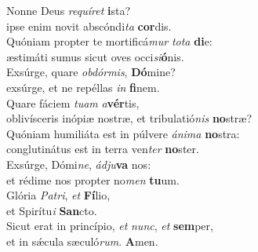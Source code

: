 \evenverse Nonne Deus \textit{re}\textit{quí}\textit{ret} \textbf{i}sta?~\*\\
\evenverse ipse enim novit abscóndi\textit{ta} \textbf{cor}dis.\\
\oddverse Quóniam propter te mortificá\textit{mur} \textit{to}\textit{ta} \textbf{di}e:~\*\\
\oddverse æstimáti sumus sicut oves occi\textit{si}\textbf{ó}nis.\\
\evenverse Exsúrge, quare \textit{ob}\textit{dór}\textit{mis}, \textbf{Dó}mine?~\*\\
\evenverse exsúrge, et ne repéllas \textit{in} \textbf{fi}nem.\\
\oddverse Quare fáciem \textit{tu}\textit{am} \textit{a}\textbf{vér}tis,~\*\\
\oddverse oblivísceris inópiæ nostræ, et tribulatió\textit{nis} \textbf{no}stræ?\\
\evenverse Quóniam humiliáta est in púlvere \textit{á}\textit{ni}\textit{ma} \textbf{no}stra:~\*\\
\evenverse conglutinátus est in terra ven\textit{ter} \textbf{no}ster.\\
\oddverse Exsúrge, Dómi\textit{ne}, \textit{ád}\textit{ju}\textbf{va} nos:~\*\\
\oddverse et rédime nos propter no\textit{men} \textbf{tu}um.\\
\evenverse Glória \textit{Pa}\textit{tri}, \textit{et} \textbf{Fí}lio,~\*\\
\evenverse et Spirítu\textit{i} \textbf{San}cto.\\
\oddverse Sicut erat in princípio, \textit{et} \textit{nunc}, \textit{et} \textbf{sem}per,~\*\\
\oddverse et in sǽcula sæculó\textit{rum}. \textbf{A}men.\\
